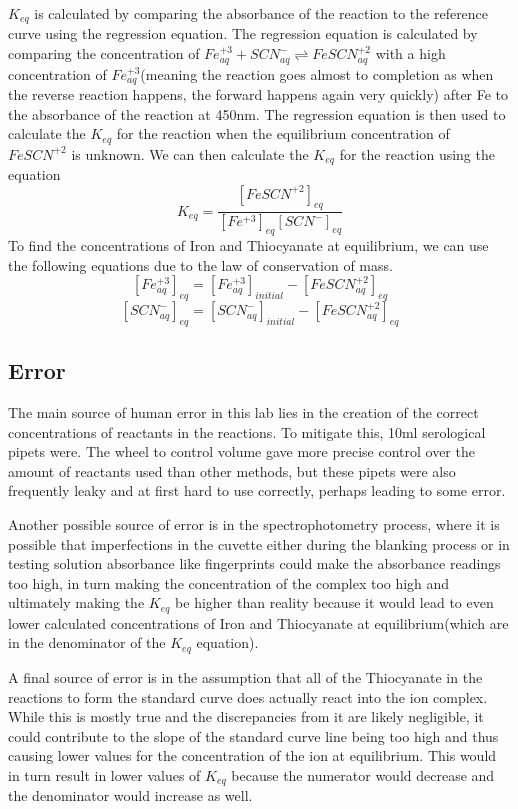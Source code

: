 \documentclass{article}
\begin{document}
$K_{eq}$ is calculated by comparing the absorbance of the reaction to the reference curve using the regression equation.  The regression equation is calculated by comparing the concentration of $Fe^{+3}_{aq} + SCN^-_{aq} \rightleftharpoons FeSCN^{+2}_{aq}$ with a high concentration of $Fe^{+3}_{aq}$(meaning the reaction goes almost to completion as when the reverse reaction happens, the forward happens again very quickly) after Fe to the absorbance of the reaction at 450nm.  The regression equation is then used to calculate the $K_{eq}$ for the reaction when the equilibrium concentration of $FeSCN^{+2}$ is unknown. We can then calculate the $K_{eq}$ for the reaction using the equation $$K_{eq} = \frac{[FeSCN^{+2}]_{eq}}{[Fe^{+3}]_{eq}[SCN^-]_{eq}}$$ To find the concentrations of Iron and Thiocyanate at equilibrium, we can use the following equations due to the law of conservation of mass.
$$[{Fe^{+3}_{aq}}]_{eq} = [{Fe^{+3}_{aq}}]_{initial} - [{FeSCN^{+2}_{aq}}]_{eq}$$
$$[{SCN^{-}_{aq}}]_{eq} = [{SCN^{-}_{aq}}]_{initial} - [{FeSCN^{+2}_{aq}}]_{eq}$$

\subsection{Error}

The main source of human error in this lab lies in the creation of the correct concentrations of reactants in the reactions.  To mitigate this, 10ml serological pipets were.  The wheel to control volume gave more precise control over the amount of reactants used than other methods, but these pipets were also frequently leaky and at first hard to use correctly, perhaps leading to some error.  

Another possible source of error is in the spectrophotometry process, where it is possible that imperfections in the cuvette either during the blanking process or in testing solution absorbance like fingerprints could make the absorbance readings too high, in turn making the concentration of the complex too high and ultimately making the $K_{eq}$ be higher than reality because it would lead to even lower calculated concentrations of Iron and Thiocyanate at equilibrium(which are in the denominator of the $K_{eq}$ equation). 

A final source of error is in the assumption that all of the Thiocyanate in the reactions to form the standard curve does actually react into the ion complex.  While this is mostly true and the discrepancies from it are likely negligible, it could contribute to the slope of the standard curve line being too high and thus causing lower values for the concentration of the ion at equilibrium.  This would in turn result in lower values of $K_{eq}$ because the numerator would decrease and the denominator would increase as well.
\end{document}
